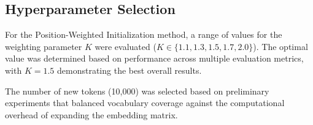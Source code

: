 \subsection{Hyperparameter Selection}
For the Position-Weighted Initialization method, a range of values for the weighting parameter $K$ were evaluated ($K \in \{1.1, 1.3, 1.5, 1.7, 2.0\}$). The optimal value was determined based on performance across multiple evaluation metrics, with $K = 1.5$ demonstrating the best overall results.

The number of new tokens (10,000) was selected based on preliminary experiments that balanced vocabulary coverage against the computational overhead of expanding the embedding matrix.
